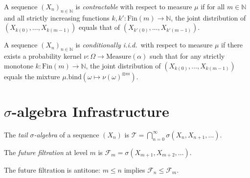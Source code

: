 \begin{definition}
  \label{def:contractable}
  \leanok
  A sequence $(X_n)_{n \in \mathbb{N}}$ is \emph{contractable} with respect to measure $\mu$
  if for all $m \in \mathbb{N}$ and all strictly increasing functions $k, k' : \mathrm{Fin}(m) \to \mathbb{N}$,
  the joint distribution of $(X_{k(0)}, \ldots, X_{k(m-1)})$ equals that of
  $(X_{k'(0)}, \ldots, X_{k'(m-1)})$.
\end{definition}

\begin{definition}
  \label{def:conditionallyIID}
  \leanok
  A sequence $(X_n)_{n \in \mathbb{N}}$ is \emph{conditionally i.i.d.}\ with respect to
  measure $\mu$ if there exists a probability kernel $\nu : \Omega \to \mathrm{Measure}(\alpha)$
  such that for any strictly monotone $k : \mathrm{Fin}(m) \to \mathbb{N}$, the joint distribution
  of $(X_{k(0)}, \ldots, X_{k(m-1)})$ equals the mixture $\mu.\mathrm{bind}(\omega \mapsto \nu(\omega)^{\otimes m})$.
\end{definition}

\section{\texorpdfstring{$\sigma$}{σ}-algebra Infrastructure}

\begin{definition}
  \label{def:tailSigma}
  \leanok
  The \emph{tail $\sigma$-algebra} of a sequence $(X_n)$ is
  $\mathcal{T} = \bigcap_{n=0}^{\infty} \sigma(X_n, X_{n+1}, \ldots)$.
\end{definition}

\begin{definition}
  \label{def:futureFiltration}
  \leanok
  The \emph{future filtration} at level $m$ is $\mathcal{F}_m = \sigma(X_{m+1}, X_{m+2}, \ldots)$.
\end{definition}

\begin{lemma}
  \label{lem:futureFiltration_antitone}
  \leanok
  The future filtration is antitone: $m \le n$ implies $\mathcal{F}_n \le \mathcal{F}_m$.
\end{lemma}

